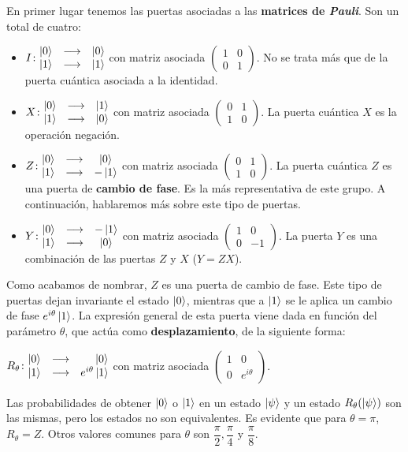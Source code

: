 En primer lugar tenemos las puertas asociadas a las \textbf{matrices de \textit{Pauli}}. Son un total de cuatro:
\begin{itemize}
\item $I\colon \begin{matrix}\left|0\right\rangle&\longrightarrow& \left|0\right\rangle\\ \left|1\right\rangle&\longrightarrow& \left|1\right\rangle\end{matrix}$ con matriz asociada $\left(\begin{matrix}1&0\\ 0&1\end{matrix}\right)$. No se trata más que de la puerta cuántica asociada a la identidad.
\item $X\colon \begin{matrix}\left|0\right\rangle&\longrightarrow& \left|1\right\rangle\\ \left|1\right\rangle&\longrightarrow& \left|0\right\rangle\end{matrix}$ con matriz asociada $\left(\begin{matrix}0&1\\ 1&0\end{matrix}\right)$. La puerta cuántica $X$ es la operación negación.
\item $Z\colon \begin{matrix}\left|0\right\rangle&\longrightarrow& \left|0\right\rangle\\ \left|1\right\rangle&\longrightarrow& -\left|1\right\rangle\end{matrix}$ con matriz asociada $\left(\begin{matrix}0&1\\ 1&0\end{matrix}\right)$. La puerta cuántica $Z$ es una puerta de \textbf{cambio de fase}. Es la más representativa de este grupo. A continuación, hablaremos más sobre este tipo de puertas.
\item $Y\colon \begin{matrix}\left|0\right\rangle&\longrightarrow& -\left|1\right\rangle\\ \left|1\right\rangle&\longrightarrow& \left|0\right\rangle\end{matrix}$ con matriz asociada $\left(\begin{matrix}1&0\\ 0&-1\end{matrix}\right)$. La puerta $Y$ es una combinación de las puertas $Z$ y $X$ ($Y=ZX$).
\end{itemize}

Como acabamos de nombrar, $Z$ es una puerta de cambio de fase. Este tipo de puertas dejan invariante el estado $\left|0\right\rangle$, mientras que a $\left|1\right\rangle$ se le aplica un cambio de fase $e^{i\theta}\left|1\right\rangle$. La expresión general de esta puerta viene dada en función del parámetro $\theta$, que actúa como \textbf{desplazamiento}, de la siguiente forma:

$\gatetwo{R_\theta}{\ \ \ \ \ket0}{e^{i\theta}\ket1}$ con matriz asociada $\left(\begin{matrix}1&0\\ 0&e^{i\theta}\end{matrix}\right)$.

Las probabilidades de obtener $\left|0\right\rangle$ o $\left|1\right\rangle$ en un estado $\left|\psi\right\rangle$ y un estado $R_\theta(\left|\psi\right\rangle)$ son las mismas, pero los estados no son equivalentes. Es evidente que para $\theta=\pi$, $R_\theta=Z$. Otros valores comunes para $\theta$ son $\dfrac{\pi}{2},\dfrac{\pi}{4}$ y $\dfrac{\pi}{8}$.

